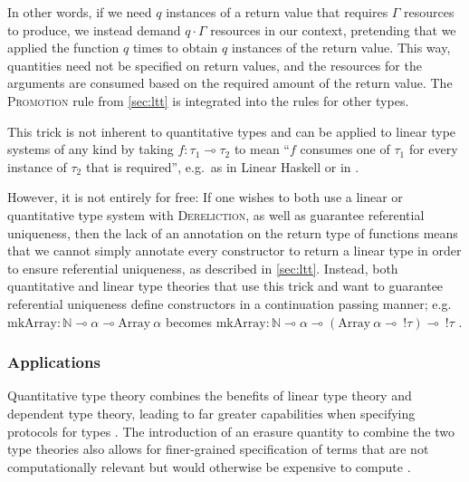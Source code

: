 In other words, if we need $q$ instances of a return value that requires $\Gamma$ resources to produce, we instead demand $q \cdot \Gamma$ resources in our context, pretending that we applied the function $q$ times to obtain $q$ instances of the return value. This way, quantities need not be specified on return values, and the resources for the arguments are consumed based on the required amount of the return value. The \textsc{Promotion} rule from \cref{sec:ltt} is integrated into the rules for other types.

This trick is not inherent to quantitative types and can be applied to linear type systems of any kind by taking $f : \tau_1 \multimap \tau_2$ to mean ``$f$ consumes one of $\tau_1$ for every instance of $\tau_2$ that is required'', e.g.\ as in Linear Haskell \citep{bernardy_linear_2018} or in \cite{ghica_bounded_2014}. 

However, it is not entirely for free: If one wishes to both use a linear or quantitative type system with \textsc{Dereliction}, as well as guarantee referential uniqueness, then the lack of an annotation on the return type of functions means that we cannot simply annotate every constructor to return a linear type in order to ensure referential uniqueness, as described in \cref{sec:ltt}. 
Instead, both quantitative and linear type theories that use this trick and want to guarantee referential uniqueness define constructors in a continuation passing manner; e.g.\ $\mathrm{mkArray} : \mathbb{N} \multimap \alpha \multimap \mathrm{Array}\ \alpha$ becomes $\mathrm{mkArray} : \mathbb{N} \multimap \alpha \multimap (\mathrm{Array}\ \alpha \multimap\ !\tau) \multimap\ !\tau$ \citep{bernardy_linear_2018}.

\subsubsection{Applications}
Quantitative type theory combines the benefits of linear type theory and dependent type theory, leading to far greater capabilities when specifying protocols for types \citep{brady_idris_2021}. The introduction of an erasure quantity to combine the two type theories also allows for finer-grained specification of terms that are not computationally relevant but would otherwise be expensive to compute \citep{brady_idris_2021}.

